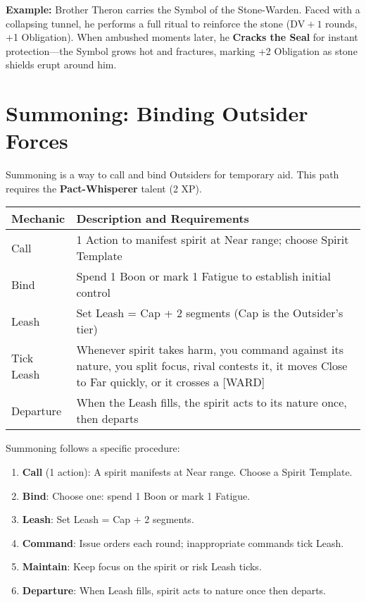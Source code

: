 \textbf{Example:} Brother Theron carries the Symbol of the Stone-Warden. Faced with a collapsing tunnel, he performs a full ritual to reinforce the stone (\(\text{DV} + 1\) rounds, +1 Obligation). When ambushed moments later, he \textbf{Cracks the Seal} for instant protection—the Symbol grows hot and fractures, marking +2 Obligation as stone shields erupt around him.

\section*{Summoning: Binding Outsider Forces}

Summoning is a way to call and bind Outsiders for temporary aid. This path requires the \textbf{Pact-Whisperer} talent (2 XP).

\begin{fatebox}
\begin{tabularx}{\textwidth}{lX}
\toprule
\textbf{Mechanic} & \textbf{Description and Requirements} \\
\midrule
Call & 1 Action to manifest spirit at Near range; choose Spirit Template \\
Bind & Spend 1 Boon or mark 1 Fatigue to establish initial control \\
Leash & Set Leash = Cap + 2 segments (Cap is the Outsider's tier) \\
Tick Leash & Whenever spirit takes harm, you command against its nature, you split focus, rival contests it, it moves Close to Far quickly, or it crosses a [WARD] \\
Departure & When the Leash fills, the spirit acts to its nature once, then departs \\
\bottomrule
\end{tabularx}
\end{fatebox}

Summoning follows a specific procedure:
\begin{enumerate}
    \item \textbf{Call} (1 action): A spirit manifests at Near range. Choose a Spirit Template.
    \item \textbf{Bind}: Choose one: spend 1 Boon or mark 1 Fatigue.
    \item \textbf{Leash}: Set Leash = Cap + 2 segments.
    \item \textbf{Command}: Issue orders each round; inappropriate commands tick Leash.
    \item \textbf{Maintain}: Keep focus on the spirit or risk Leash ticks.
    \item \textbf{Departure}: When Leash fills, spirit acts to nature once then departs.
\end{enumerate}

